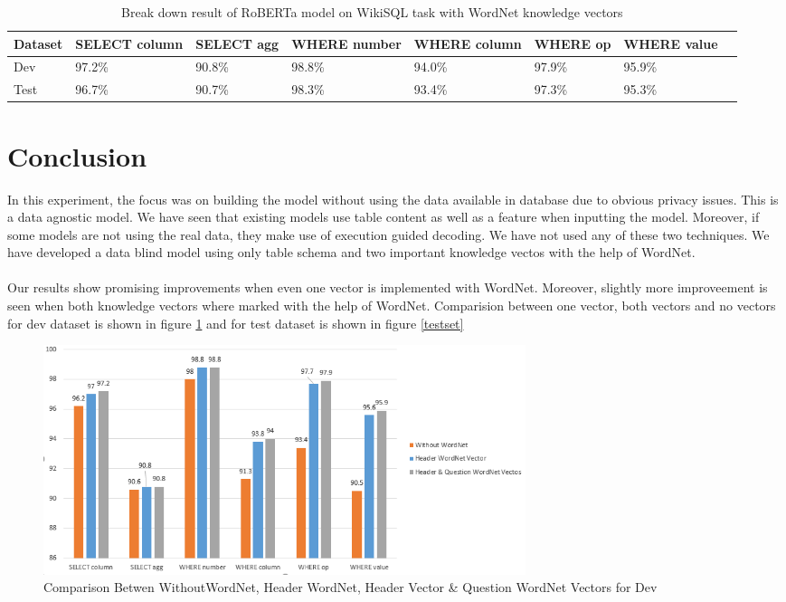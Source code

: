 \documentclass[12pt]{article}
\begin{document}
\begin{table}
\centering
 \begin{tabular}{| m{2cm} | m{2cm}| m{2cm} |m{2cm}| m{2cm} |m{2cm} | m{2cm} |m{2cm} |} 
 \hline
  Dataset & SELECT column & SELECT agg & WHERE number & WHERE column & WHERE op & WHERE value\\ 
 \hline\hline
  Dev & 97.2\% & 90.8\% & 98.8\% & 94.0\% & 97.9\% &  95.9\% \\ 
\hline
 Test & 96.7\% & 90.7\% & 98.3\% & 93.4\% & 97.3\% &  95.3\% \\ 
 \hline

\end{tabular}
\caption{Break down result of RoBERTa model on WikiSQL task with WordNet knowledge vectors}
\label{robertatabledetailedtwoheader}
\end{table}



\section{Conclusion}
In this experiment, the focus was on building the model without using the data available in database due to obvious privacy issues. This is a data agnostic model. We have seen that existing models use table content as well as a feature when inputting the model. Moreover, if some models are not using the real data, they make use of execution guided decoding. We have not used any of these two techniques. We have developed a data blind model using only table schema and two important knowledge vectos with the help of WordNet. 
\\
\\
Our results show promising improvements when even one vector is implemented with WordNet. Moreover, slightly more improveement is seen when both knowledge vectors where marked with the help of WordNet. Comparision between one vector, both vectors and no vectors for dev dataset is shown in figure \ref{devset} and for test dataset is shown in figure \ref{testset}


\begin{figure}[H]
    \includegraphics[width=400pt]{devset}
    \caption{Comparison Betwen WithoutWordNet, Header WordNet, Header Vector \&  Question WordNet Vectors for Dev}
    \label{devset}
\end{figure}
\end{document}
